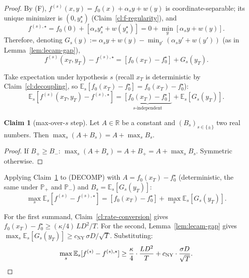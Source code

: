 \documentclass[11pt]{article}
\theoremstyle{definition}
\newtheorem{claim}[theorem]{Claim}
\theoremstyle{remark}
\begin{document}
\begin{proof}
By (F), $f^{(s)}(x,y) = f_0(x) + \alpha_s y + w(y)$ is coordinate-separable; its unique minimizer is $(0, y^\star_s)$ (Claim~\ref{cl:f-regularity}), and
\[
  f^{(s),\star} = f_0(0) + [\alpha_s y^\star_s + w(y^\star_s)] = 0 + \min_y[\alpha_s y + w(y)].
\]
Therefore, denoting $G_s(y) := \alpha_s y + w(y) - \min_{y'}(\alpha_s y' + w(y'))$ (as in Lemma~\ref{lem:lecam-gap}),
\[
  f^{(s)}(x_T, y_T) - f^{(s),\star} = [f_0(x_T) - f_0^\star] + G_s(y_T).
\]

Take expectation under hypothesis $s$ (recall $x_T$ is deterministic by Claim~\ref{cl:decoupling}, so $\mathbb{E}_s[f_0(x_T) - f_0^\star] = f_0(x_T) - f_0^\star$):
\begin{equation}
  \mathbb{E}_s[f^{(s)}(x_T, y_T) - f^{(s),\star}] = \underbrace{[f_0(x_T) - f_0^\star]}_{s\text{-independent}} + \mathbb{E}_s[G_s(y_T)]. \tag{DECOMP}
\end{equation}

\begin{claim}[max-over-$s$ step]
\label{cl:max-step}
Let $A \in \mathbb{R}$ be a constant and $(B_s)_{s \in \{\pm\}}$ two real numbers. Then $\max_s (A + B_s) = A + \max_s B_s$.
\end{claim}

\begin{proof}
If $B_+ \geq B_-$: $\max_s(A + B_s) = A + B_+ = A + \max_s B_s$. Symmetric otherwise.
\end{proof}

Applying Claim~\ref{cl:max-step} to (DECOMP) with $A = f_0(x_T) - f_0^\star$ (deterministic, the same under $\mathbb{P}_+$ and $\mathbb{P}_-$) and $B_s = \mathbb{E}_s[G_s(y_T)]$:
\begin{equation}
  \max_s \mathbb{E}_s[f^{(s)} - f^{(s),\star}] = [f_0(x_T) - f_0^\star] + \max_s \mathbb{E}_s[G_s(y_T)]. \tag{MAX}
\end{equation}

For the first summand, Claim~\ref{cl:rate-conversion} gives $f_0(x_T) - f_0^\star \geq (\kappa/4)\,LD^2/T$. For the second, Lemma~\ref{lem:lecam-gap} gives $\max_s \mathbb{E}_s[G_s(y_T)] \geq c_{\mathrm{NY}}\,\sigma D/\sqrt T$. Substituting:
\[
  \max_s \mathbb{E}_s[f^{(s)} - f^{(s),\star}] \geq \frac{\kappa}{4}\cdot\frac{LD^2}{T} + c_{\mathrm{NY}}\cdot \frac{\sigma D}{\sqrt T}. \qedhere
\]
\end{proof}
\end{document}
